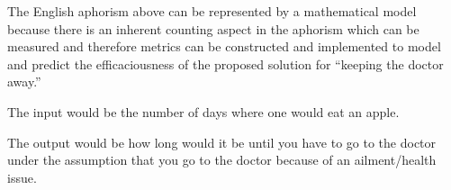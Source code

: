 \documentclass[12pt]{article}
\begin{document}
\newpage

\begin{enumerate}


\begin{tcolorbox}[colback=white, sharp corners]

The English aphorism above can be represented by a mathematical model because there is an inherent counting aspect in the aphorism which can be measured and therefore metrics can be constructed and implemented to model and predict the efficaciousness of the proposed solution for ``keeping the doctor away.''

\end{tcolorbox}


\begin{tcolorbox}[colback=white, sharp corners]

The input would be the number of days where one would eat an apple. 

\end{tcolorbox}


\begin{tcolorbox}[colback=white, sharp corners]

The output would be how long would it be until you have to go to the doctor under the assumption that you go to the doctor because of an ailment/health issue.

\end{tcolorbox}



\end{enumerate}
\end{document}
